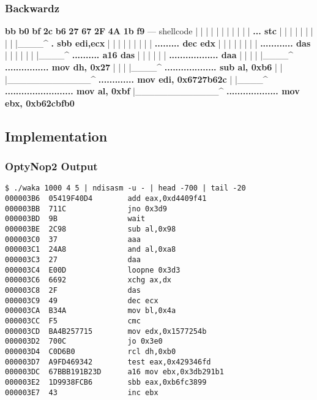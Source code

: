 \documentclass{beamer}
\begin{document}
\begin{frame}[fragile]
  \frametitle{Backwardz}
  {\footnotesize
  \begin{semiverbatim}
  \textbf<11>{bb} \textbf<10,11>{b0} \textbf<9,10,11>{bf} \textbf<8,9,11>{2c} \textbf<7,8,9,11>{b6} \textbf<6,7,9>{27} \textbf<5,9>{67} \textbf<4,5>{2F} \textbf<3>{4A} \textbf<2>{1b} \textbf<1,2>{f9} --- shellcode
  |  |  |  |  |  |  |  |  |  |  | \textbf<1>{... stc}
  |  |  |  |  |  |  |  |  |  |____^ \textbf<2>{. sbb edi,ecx}
  |  |  |  |  |  |  |  |  | \textbf<3>{......... dec edx}
  |  |  |  |  |  |  |  | \textbf<4>{............ das}
  |  |  |  |  |  |  |____^ \textbf<5>{.......... a16 das}
  |  |  |  |  |  | \textbf<6>{.................. daa}
  |  |  |  |  |____^ \textbf<7>{................ mov dh, 0x27}
  |  |  |  |____^ \textbf<8>{................... sub al, 0xb6}
  |  |  |_____________^ \textbf<9>{............. mov edi, 0x6727b62c}
  |  |____^ \textbf<10>{......................... mov al, 0xbf}
  |_____________^ \textbf<11>{................... mov ebx, 0xb62cbfb0}
\end{semiverbatim}
}
\end{frame}

\subsection{Implementation}

\begin{frame}[fragile]
  \frametitle{OptyNop2 Output}
  {\footnotesize
  \begin{verbatim}
$ ./waka 1000 4 5 | ndisasm -u - | head -700 | tail -20
000003B6  05419F40D4        add eax,0xd4409f41
000003BB  711C              jno 0x3d9
000003BD  9B                wait
000003BE  2C98              sub al,0x98
000003C0  37                aaa
000003C1  24A8              and al,0xa8
000003C3  27                daa
000003C4  E00D              loopne 0x3d3
000003C6  6692              xchg ax,dx
000003C8  2F                das
000003C9  49                dec ecx
000003CA  B34A              mov bl,0x4a
000003CC  F5                cmc
000003CD  BA4B257715        mov edx,0x1577254b
000003D2  700C              jo 0x3e0
000003D4  C0D6B0            rcl dh,0xb0
000003D7  A9FD469342        test eax,0x429346fd
000003DC  67BBB191B23D      a16 mov ebx,0x3db291b1
000003E2  1D9938FCB6        sbb eax,0xb6fc3899
000003E7  43                inc ebx
\end{verbatim}
}
\end{frame}
\end{document}
